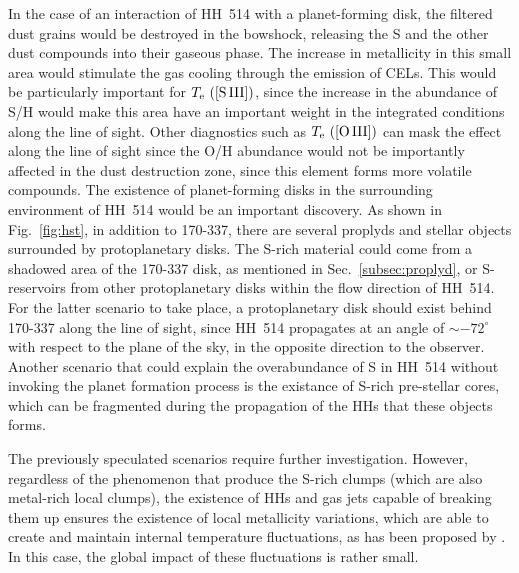 \documentclass[fleqn,usenatbib]{mnras}
\begin{document}
In the case of an interaction of HH~514 with a planet-forming disk, the filtered dust grains would be destroyed in the bowshock, releasing the S and the other dust compounds into their gaseous phase. The increase in metallicity in this small area would stimulate the gas cooling through the emission of CELs. This would be particularly important for $T_{\rm e} \text{ ([S\thinspace III])}$, since the increase in the abundance of S/H would make this area have an important weight in the integrated conditions along the line of sight. Other diagnostics such as $T_{\rm e} \text{ ([O\thinspace III])}$ can mask the effect along the line of sight since the O/H abundance would not be importantly affected in the dust destruction zone, since this element forms more volatile compounds. The existence of planet-forming disks in the surrounding environment of HH~514 would be an important discovery. As shown in Fig.~\ref{fig:hst}, in addition to 170-337, there are several proplyds and stellar objects surrounded by protoplanetary disks. The S-rich material could come from a shadowed area of the 170-337 disk, as mentioned in Sec.~\ref{subsec:proplyd}, or S-reservoirs from other protoplanetary disks within the flow direction of HH~514. For the latter scenario to take place, a protoplanetary disk should exist behind 170-337 along the line of sight, since HH~514 propagates at an angle of $\sim -72 ^\circ$  with respect to the plane of the sky, in the opposite direction to the observer. Another scenario that could explain the overabundance of S in HH~514 without invoking the planet formation process is the existance of S-rich pre-stellar cores, which can be fragmented during the propagation of the HHs that these objects forms.  

The previously speculated scenarios require further investigation. However, regardless of the phenomenon that produce the S-rich clumps (which are also metal-rich local clumps), the existence of HHs and gas jets capable of breaking them up ensures the existence of local metallicity variations, which are able to create and maintain internal temperature fluctuations, as has been proposed by \citet{Peimbert67}. In this case, the global impact of these fluctuations is rather small.


\end{document}
